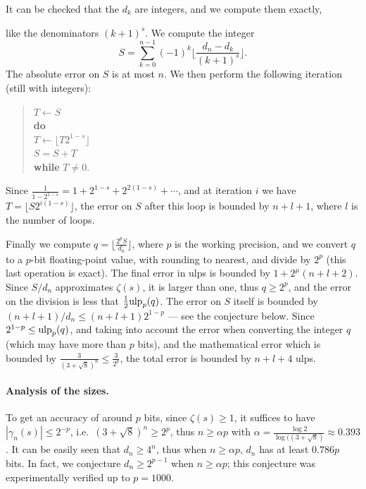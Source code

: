 \documentclass[12pt]{amsart}
\def\q{\hspace*{5mm}}
\def\ulp{{\rm ulp}}
\DeclareMathOperator{\error}{error}
\begin{document}
It can be checked that the $d_k$ are integers, and we compute them exactly,

like the denominators $(k+1)^s$.
We compute the integer
\[ S =
\sum_{k=0}^{n-1} (-1)^k \lfloor \frac{d_n - d_k}{(k+1)^s}
\rfloor. \]
The absolute error on $S$ is at most $n$. We then perform the following
iteration (still with integers):
\begin{quote}
$T \leftarrow S$ \\
\textbf{do} \\
\q $T \leftarrow \lfloor T 2^{1-s} \rfloor$ \\
\q $S = S + T$ \\
\textbf{while} $T \neq 0$.
\end{quote}
Since $\frac{1}{1-2^{1-s}} = 1 + 2^{1-s} + 2^{2(1-s)} + \cdots$, and
at iteration $i$ we have $T = \lfloor S 2^{i(1-s)} \rfloor$,
the error on $S$ after this loop is bounded by $n+l+1$,
where $l$ is the number of loops.

Finally we compute $q = \lfloor \frac{2^p S}{d_n} \rfloor$,
where $p$ is the working precision,
and we convert $q$ to a $p$-bit floating-point value,
with rounding to nearest, and divide by $2^p$ (this last operation is
exact).
The final error in ulps is bounded by $1 + 2^{\mu} (n+l+2)$.
Since $S/d_n$ approximates $\zeta(s)$, it is larger than one, thus
$q \geq 2^p$, and the error on the division is less that
$\frac{1}{2}\ulp_p(q)$. The error on $S$ itself is bounded by $(n+l+1)/d_n
\leq (n+l+1) 2^{1-p}$ --- see the conjecture below.
Since $2^{1-p} \leq \ulp_p(q)$, and taking into account the error when
converting the integer $q$ (which may have more than $p$ bits),
and the mathematical error which is bounded by $\frac{3}{(3+\sqrt{8})^n}
\leq \frac{3}{2^p}$, the total error is bounded by $n+l+4$ ulps.

\paragraph{Analysis of the sizes.}
To get an accuracy of around $p$ bits, since $\zeta(s) \geq 1$, it suffices
to have $|\gamma_n(s)| \leq 2^{-p}$, i.e.\ $(3+\sqrt{8})^n \ge 2^p$,
thus $n \ge \alpha p$ with $\alpha = \frac{\log 2}{\log ((3+\sqrt{8})}
\approx 0.393$.
It can be easily seen that $d_n \geq 4^n$, thus when $n \ge \alpha p$,
$d_n$ has at least $0.786 p$ bits.
In fact, we conjecture $d_n \geq 2^{p-1}$ when $n \geq \alpha p$;
this conjecture was experimentally verified up to $p=1000$.
\end{document}
